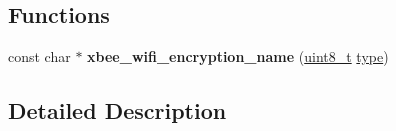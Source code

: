 \subsection*{Functions}
\begin{DoxyCompactItemize}
\item 
\mbox{\label{group__xbee__wifi_gadfbb4dcc42302b264f6b3d291ca4a8eb}} 
const char $\ast$ {\bfseries xbee\+\_\+wifi\+\_\+encryption\+\_\+name} (\hyperlink{group__hal__dos_gae1affc9ca37cfb624959c866a73f83c2}{uint8\+\_\+t} \hyperlink{group__zcl_ga1d127017fb298b889f4ba24752d08b8e}{type})
\end{DoxyCompactItemize}


\subsection{Detailed Description}
